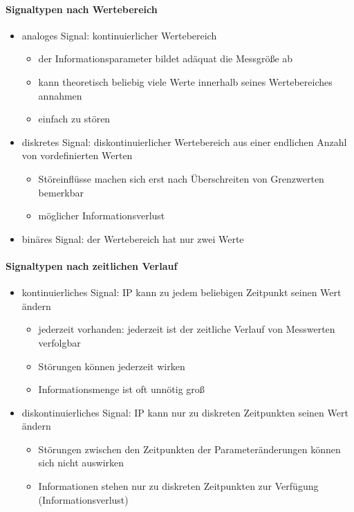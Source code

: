 \documentclass[a4paper]{scrartcl}
\begin{document}
\paragraph{Signaltypen nach Wertebereich}
\begin{itemize}
\item analoges Signal: kontinuierlicher Wertebereich
    \begin{itemize}
    \item der Informationsparameter bildet adäquat die Messgröße ab
    \item kann theoretisch beliebig viele Werte innerhalb seines Wertebereiches annahmen
    \item einfach zu stören
    \end{itemize}
\item diskretes Signal: diskontinuierlicher Wertebereich aus einer endlichen Anzahl von vordefinierten Werten
    \begin{itemize}
    \item Störeinflüsse machen sich erst nach Überschreiten von Grenzwerten bemerkbar
    \item möglicher Informationsverlust
    \end{itemize}
\item binäres Signal: der Wertebereich hat nur zwei Werte
\end{itemize}

\paragraph{Signaltypen nach zeitlichen Verlauf}
\begin{itemize}
\item kontinuierliches Signal: IP kann zu jedem beliebigen Zeitpunkt seinen Wert ändern
    \begin{itemize}
    \item jederzeit vorhanden: jederzeit ist der zeitliche Verlauf von Messwerten verfolgbar
    \item Störungen können jederzeit wirken
    \item Informationsmenge ist oft unnötig groß
    \end{itemize}
\item diskontinuierliches Signal: IP kann nur zu diskreten Zeitpunkten seinen Wert ändern
    \begin{itemize}
    \item Störungen zwischen den Zeitpunkten der Parameteränderungen können sich nicht auswirken
    \item Informationen stehen nur zu diskreten Zeitpunkten zur Verfügung (Informationsverlust)
    \end{itemize}
\end{itemize}
\end{document}
